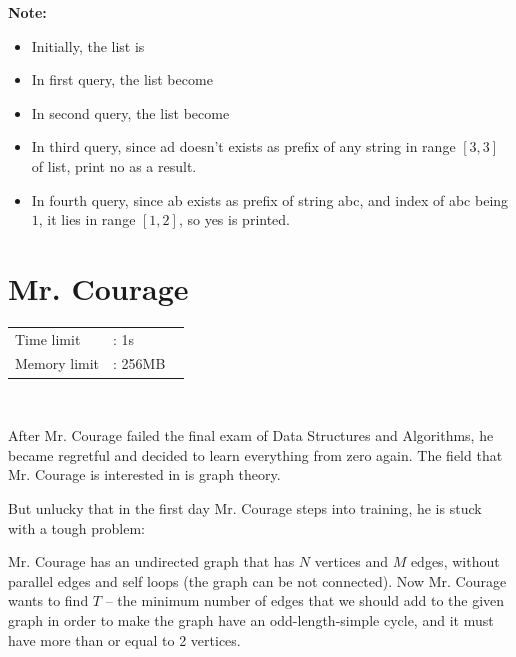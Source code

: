 \documentclass[12pt]{article}
\begin{document}
	\textbf{Note: }
	\begin{itemize}
		\item Initially, the list is {\selectfont [abc]}
		\item In first query, the list become {\selectfont [abc,ad]}
		\item In second query, the list become {\selectfont [abc, ad, ab]}
		\item In third query, since {\selectfont ad} doesn't exists as prefix of any string in range $[3, 3]$ of list, print {\selectfont no} as a result.
		\item In fourth query, since {\selectfont ab} exists as prefix of string {\selectfont abc}, and index of {\selectfont abc} being $1$, it lies in range $[1, 2]$, so {\selectfont yes} is printed.
	\end{itemize}
	\pagebreak
	
	\section{Mr. Courage}
	
	\vspace{-0.5cm}
	\begin{table}[!h]
		\hspace{1cm}
		\begin{tabular}{ll}
			Time limit   &: 1s        \\
			Memory limit &: 256MB         \
		\end{tabular}\\
	\end{table}
	
	After Mr. Courage failed the final exam of Data Structures and Algorithms, he became regretful and decided to learn everything from zero again. The field that Mr. Courage is interested in is graph theory.
	
	But unlucky that in the first day Mr. Courage steps into training,  he is stuck with a tough problem:
	
	Mr. Courage has an undirected graph that has $N$ vertices and $M$ edges, without parallel edges and self loops (the graph can be not connected). Now Mr. Courage wants to find $T$ – the minimum number of edges that we should add to the given graph in order to make the graph have an odd-length-simple cycle, and it must have more than or equal to 2 vertices.
	
\end{document}
